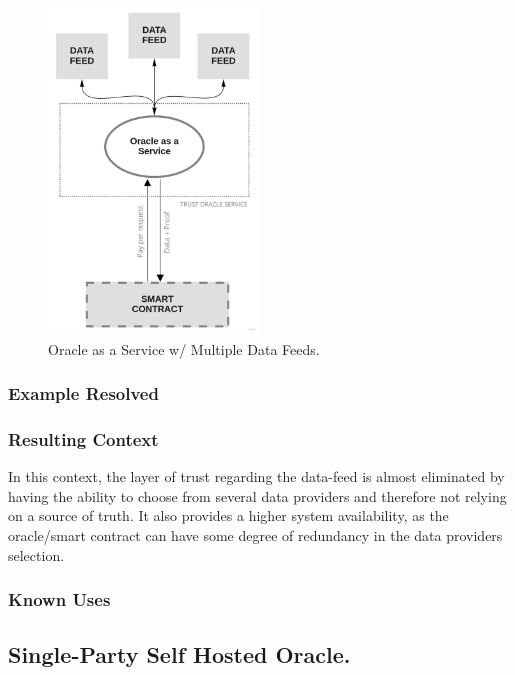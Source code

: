 \begin{figure}[t]
  \begin{center}
    \leavevmode
    \includegraphics[width=0.5\textwidth]{figures/oraclearch2.jpg}
    \caption{Oracle as a Service w/ Multiple Data Feeds.}
    \label{fig:/figures/paper-screening}
  \end{center}
\end{figure}

\subsubsection{Example Resolved}
\subsubsection{Resulting Context}
In this context, the layer of trust regarding the data-feed is almost eliminated by having the ability to choose from several data providers and therefore not relying on a source of truth. It also provides a higher system availability, as the oracle/smart contract can have some degree of redundancy in the data providers selection.

\subsubsection{Known Uses}

\subsection{Single-Party Self Hosted Oracle.}


